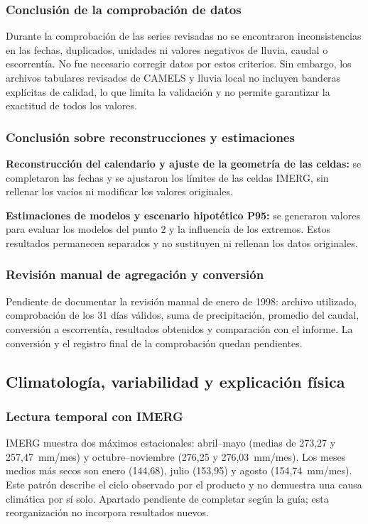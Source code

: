 \documentclass[10pt,a4paper]{article}
\begin{document}
\subsubsection*{Conclusión de la comprobación de datos}
Durante la comprobación de las series revisadas no se encontraron inconsistencias en las fechas, duplicados, unidades ni valores negativos de lluvia, caudal o escorrentía. No fue necesario corregir datos por estos criterios. Sin embargo, los archivos tabulares revisados de CAMELS y lluvia local no incluyen banderas explícitas de calidad, lo que limita la validación y no permite garantizar la exactitud de todos los valores.



\subsubsection*{Conclusión sobre reconstrucciones y estimaciones}
\textbf{Reconstrucción del calendario y ajuste de la geometría de las celdas:} se completaron las fechas y se ajustaron los límites de las celdas IMERG, sin rellenar los vacíos ni modificar los valores originales.

\textbf{Estimaciones de modelos y escenario hipotético P95:} se generaron valores para evaluar los modelos del punto 2 y la influencia de los extremos. Estos resultados permanecen separados y no sustituyen ni rellenan los datos originales.

\subsubsection*{Revisión manual de agregación y conversión}
Pendiente de documentar la revisión manual de enero de 1998: archivo utilizado, comprobación de los 31 días válidos, suma de precipitación, promedio del caudal, conversión a escorrentía, resultados obtenidos y comparación con el informe. La conversión y el registro final de la comprobación quedan pendientes.
\subsection{Climatología, variabilidad y explicación física}
\subsubsection*{Lectura temporal con IMERG}
IMERG muestra dos máximos estacionales: abril--mayo (medias de 273,27 y 257,47~mm/mes) y octubre--noviembre (276,25 y 276,03~mm/mes). Los meses medios más secos son enero (144,68), julio (153,95) y agosto (154,74~mm/mes). Este patrón describe el ciclo observado por el producto y no demuestra una causa climática por sí solo.
Apartado pendiente de completar según la guía; esta reorganización no incorpora resultados nuevos.
\end{document}
